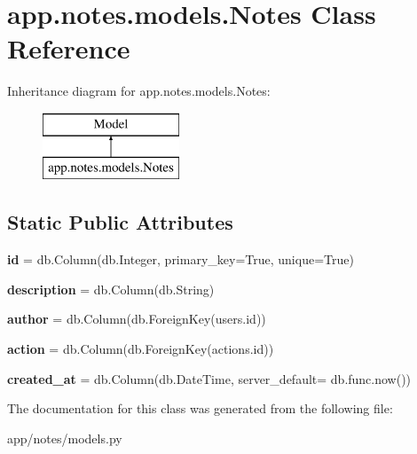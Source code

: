 \hypertarget{classapp_1_1notes_1_1models_1_1_notes}{}\section{app.\+notes.\+models.\+Notes Class Reference}
\label{classapp_1_1notes_1_1models_1_1_notes}
Inheritance diagram for app.\+notes.\+models.\+Notes\+:\begin{figure}[H]
\begin{center}
\leavevmode
\includegraphics[height=2.000000cm]{classapp_1_1notes_1_1models_1_1_notes}
\end{center}
\end{figure}
\subsection*{Static Public Attributes}
\begin{DoxyCompactItemize}
\item 
\mbox{\label{classapp_1_1notes_1_1models_1_1_notes_a0fab9aac35077f9e24ebb1558b0da526}} 
{\bfseries id} = db.\+Column(db.\+Integer, primary\+\_\+key=True, unique=True)
\item 
\mbox{\label{classapp_1_1notes_1_1models_1_1_notes_a5b5ee3dc95f1e974c9aa5acce203857a}} 
{\bfseries description} = db.\+Column(db.\+String)
\item 
\mbox{\label{classapp_1_1notes_1_1models_1_1_notes_a4dc95eb68a8fd9abc1f04f7546b23a93}} 
{\bfseries author} = db.\+Column(db.\+Foreign\+Key(\textquotesingle{}users.\+id\textquotesingle{}))
\item 
\mbox{\label{classapp_1_1notes_1_1models_1_1_notes_aae6677abfdc262d93bf1ef05788499cd}} 
{\bfseries action} = db.\+Column(db.\+Foreign\+Key(\textquotesingle{}actions.\+id\textquotesingle{}))
\item 
\mbox{\label{classapp_1_1notes_1_1models_1_1_notes_a2df3204b65153089aecdfc9710f35f1c}} 
{\bfseries created\+\_\+at} = db.\+Column(db.\+Date\+Time, server\+\_\+default= db.\+func.\+now())
\end{DoxyCompactItemize}


The documentation for this class was generated from the following file\+:\begin{DoxyCompactItemize}
\item 
app/notes/models.\+py\end{DoxyCompactItemize}
